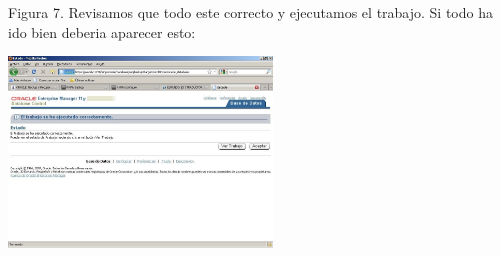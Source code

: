 \documentclass[a4paper,twocolumn,10pt]{article}
\begin{document}
\begin{enumerate}[4.1]
\begin{center}
	\end{center}
	Figura 7. Revisamos que todo este correcto y ejecutamos el trabajo. Si todo ha ido bien deberia aparecer esto:
	\begin{center}
	\includegraphics[width=7cm]{./Imagenes/b7}  
	\end{center}




\end{enumerate}
\end{document}
